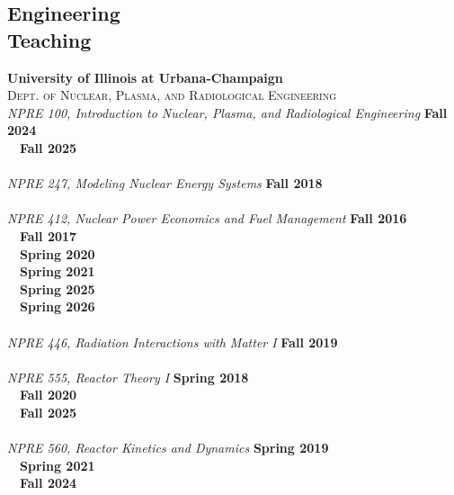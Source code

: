 \documentclass[margin,line]{resume}
\begin{document}
\begin{resume}
    \section{\mysidestyle Engineering\\Teaching}
    \textbf{University of Illinois at Urbana-Champaign}\\
    \textsc{Dept. of Nuclear, Plasma, and Radiological Engineering}\\
               \textsl{NPRE 100, Introduction to Nuclear, Plasma, and Radiological Engineering} \hfill \textbf{Fall 2024}\\
               \mbox{ }~\hfill \textbf{Fall 2025}\\
               \vspace{2mm}\\
               \textsl{NPRE 247, Modeling Nuclear Energy Systems} \hfill \textbf{Fall 2018}\\
               \vspace{2mm}\\
               \textsl{NPRE 412, Nuclear Power Economics and Fuel Management} \hfill \textbf{Fall 2016}\\
               \mbox{ }~\hfill \textbf{Fall 2017}\\
               \mbox{ }~\hfill \textbf{Spring 2020}\\
               \mbox{ }~\hfill \textbf{Spring 2021}\\
               \mbox{ }~\hfill \textbf{Spring 2025}\\
               \mbox{ }~\hfill \textbf{Spring 2026}\\
               \vspace{2mm}\\
               \textsl{NPRE 446, Radiation Interactions with Matter I} \hfill \textbf{Fall 2019}\\
               \vspace{2mm}\\
               \textsl{NPRE 555, Reactor Theory I} \hfill \textbf{Spring 2018}\\
               \mbox{ }~\hfill \textbf{Fall 2020}\\
               \mbox{ }~\hfill \textbf{Fall 2025}\\
               \vspace{2mm}\\
               \textsl{NPRE 560, Reactor Kinetics and Dynamics} \hfill \textbf{Spring 2019}\\
               \mbox{ }~\hfill \textbf{Spring 2021}\\
               \mbox{ }~\hfill \textbf{Fall 2024}\\
               \vspace{2mm}\\

\end{resume}
\end{document}

